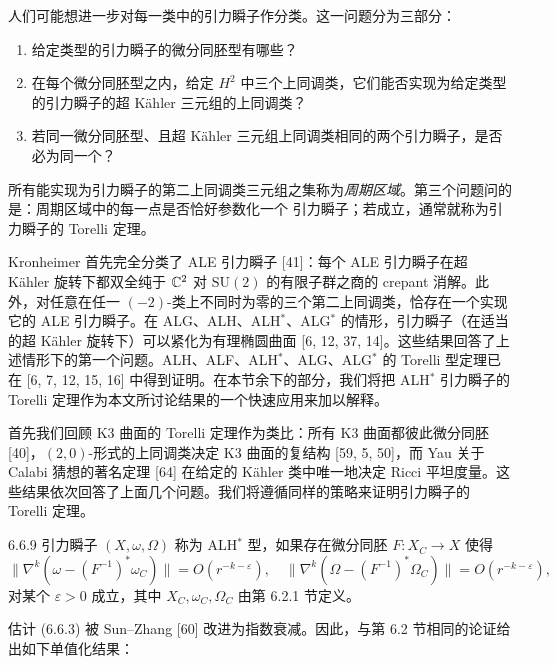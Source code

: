 人们可能想进一步对每一类中的引力瞬子作分类。这一问题分为三部分：
\begin{enumerate}
\item 给定类型的引力瞬子的微分同胚型有哪些？
\item 在每个微分同胚型之内，给定 $H^2$ 中三个上同调类，它们能否实现为给定类型的引力瞬子的超 Kähler 三元组的上同调类？
\item 若同一微分同胚型、且超 Kähler 三元组上同调类相同的两个引力瞬子，是否必为同一个？
\end{enumerate}
所有能实现为引力瞬子的第二上同调类三元组之集称为\emph{周期区域}。第三个问题问的是：周期区域中的每一点是否恰好参数化一个
引力瞬子；若成立，通常就称为引力瞬子的 Torelli 定理。

Kronheimer 首先完全分类了 ALE 引力瞬子 [41]：每个 ALE 引力瞬子在超 Kähler 旋转下都双全纯于 $\mathbb{C}^2$ 对 $\mathrm{SU}(2)$ 的有限子群之商的 crepant 消解。此外，对任意在任一 $(-2)$-类上不同时为零的三个第二上同调类，恰存在一个实现它的 ALE 引力瞬子。在 ALG、ALH、ALH$^*$、ALG$^*$ 的情形，引力瞬子（在适当的超 Kähler 旋转下）可以紧化为有理椭圆曲面 [6, 12, 37, 14]。这些结果回答了上述情形下的第一个问题。ALH、ALF、ALH$^*$、ALG、ALG$^*$ 的 Torelli 型定理已在 [6, 7, 12, 15, 16] 中得到证明。在本节余下的部分，我们将把 ALH$^*$ 引力瞬子的 Torelli 定理作为本文所讨论结果的一个快速应用来加以解释。

首先我们回顾 K3 曲面的 Torelli 定理作为类比：所有 K3 曲面都彼此微分同胚 [40]，$(2,0)$-形式的上同调类决定 K3 曲面的复结构 [59, 5, 50]，而 Yau 关于 Calabi 猜想的著名定理 [64] 在给定的 Kähler 类中唯一地决定 Ricci 平坦度量。这些结果依次回答了上面几个问题。我们将遵循同样的策略来证明引力瞬子的 Torelli 定理。

\begin{definition}{6.6.9}
引力瞬子 $(X,\omega,\Omega)$ 称为 ALH$^*$ 型，如果存在微分同胚 $F:X_C\to X$ 使得
\begin{equation}
\|\nabla^k(\omega-(F^{-1})^*\omega_C)\|=O(r^{-k-\varepsilon}),\quad \|\nabla^k(\Omega-(F^{-1})^*\Omega_C)\|=O(r^{-k-\varepsilon}), \tag{6.6.3}
\end{equation}
对某个 $\varepsilon>0$ 成立，其中 $X_C,\omega_C,\Omega_C$ 由第 6.2.1 节定义。
\end{definition}

估计 (6.6.3) 被 Sun--Zhang [60] 改进为指数衰减。因此，与第 6.2 节相同的论证给出如下单值化结果：

